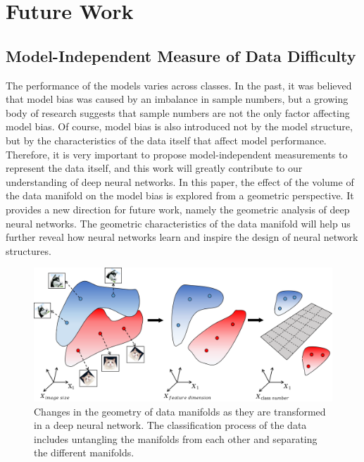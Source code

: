 \documentclass[10pt]{article} %
\begin{document}
\iffalse
\section{Future Work\label{J}}

\subsection{Model-Independent Measure of Data Difficulty\label{J.1}}

The performance of the models varies across classes. In the past, it was believed that model bias was caused by an imbalance in sample numbers, but a growing body of research suggests that sample numbers are not the only factor affecting model bias. Of course, model bias is also introduced not by the model structure, but by the characteristics of the data itself that affect model performance. Therefore, it is very important to propose model-independent measurements to represent the data itself, and this work will greatly contribute to our understanding of deep neural networks. In this paper, the effect of the volume of the data manifold on the model bias is explored from a geometric perspective. It provides a new direction for future work, namely the geometric analysis of deep neural networks. The geometric characteristics of the data manifold will help us further reveal how neural networks learn and inspire the design of neural network structures.

\begin{figure}[h]%
\begin{center}
\includegraphics[width=1\columnwidth]{fig24}
\vskip -0.05in
\caption{Changes in the geometry of data manifolds as they are transformed in a deep neural network. The classification process of the data includes untangling the manifolds from each other and separating the different manifolds.}
\label{fig25}
\end{center}
\vskip -0.15in
\end{figure}
\end{document}
